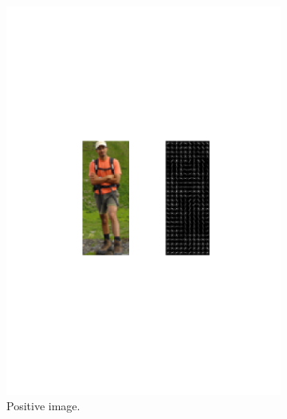 \begin{figure}[h]
  \centering
  \begin{subfigure}[b]{0.45\textwidth}
   \includegraphics[width=\textwidth]{figures/positive_image.pdf}
    \caption{Positive image.}
  \end{subfigure}
  \begin{subfigure}[b]{0.45\textwidth}

\end{subfigure}
\end{figure}
